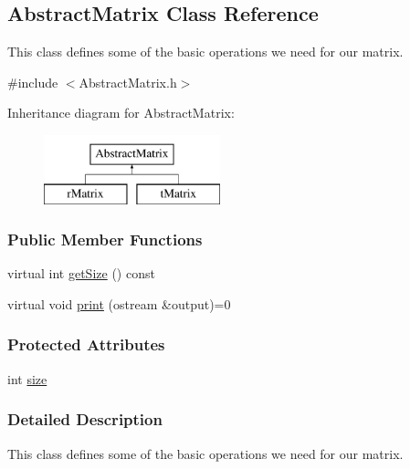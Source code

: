 \hypertarget{class_abstract_matrix}{\subsection{Abstract\+Matrix Class Reference}
\label{class_abstract_matrix}
}


This class defines some of the basic operations we need for our matrix.  




{\ttfamily \#include $<$Abstract\+Matrix.\+h$>$}

Inheritance diagram for Abstract\+Matrix\+:\begin{figure}[H]
\begin{center}
\leavevmode
\includegraphics[height=2.000000cm]{class_abstract_matrix}
\end{center}
\end{figure}
\subsubsection*{Public Member Functions}
\begin{DoxyCompactItemize}
\item 
virtual int \hyperlink{class_abstract_matrix_a8aa21743b81e47939757beda61b33dfd}{get\+Size} () const 
\item 
virtual void \hyperlink{class_abstract_matrix_a300f90398cb2bac75c8d2ab56bdde1ab}{print} (ostream \&output)=0
\end{DoxyCompactItemize}
\subsubsection*{Protected Attributes}
\begin{DoxyCompactItemize}
\item 
int \hyperlink{class_abstract_matrix_aca80e2403cf7903a106595ba56390e99}{size}
\end{DoxyCompactItemize}


\subsubsection{Detailed Description}
This class defines some of the basic operations we need for our matrix. 

